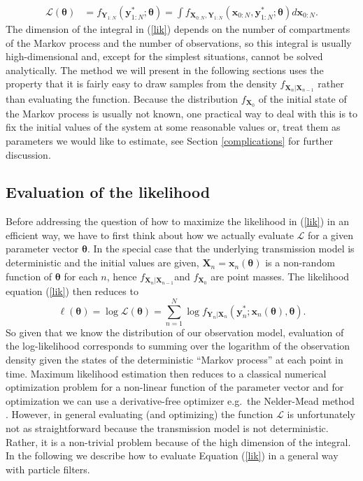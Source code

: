 \begin{align}
\mathcal{L}(\bm{\theta})&=f_{\bm{Y}_{1:N}}(\bm{y}^*_{1:N};\bm{\theta})=\int f_{\bm{X}_{0:N},\bm{Y}_{1:N}}(\bm{x}_{0:N},\bm{y}^*_{1:N};\bm{\theta})d\bm{x}_{0:N}.
\label{lik}
\end{align}
The dimension of the integral in (\ref{lik}) depends on the number of compartments of the Markov process and the number of observations, so this integral is usually high-dimensional and, except for the simplest situations, cannot be solved analytically. The method we will present in the following sections uses the property that it is fairly easy to draw samples from the density $f_{\bm{X}_n|\bm{X}_{n-1}}$ rather than evaluating the function. Because the distribution  $f_{\bm{X}_0}$ of the initial state of the Markov process is usually not known,  one practical way to deal with this is to  fix the initial values of the system  at some  reasonable values or,  treat them  as parameters we would like to estimate, see Section \ref{complications} for further discussion.  
 \subsection{Evaluation of the likelihood}
 \label{evaluation}
 Before addressing the question of  how to maximize the likelihood in (\ref{lik}) in an efficient way, we have to first think about how we actually evaluate $\mathcal{L}$ for a given parameter vector $\bm{\theta}$. 
In the special case that the underlying transmission model is deterministic and the initial values are given,  $\bm{X}_n=\bm{x}_n(\bm{\theta})$ is a non-random function of $\bm{\theta}$ for each $n$, hence $f_{\bm{X}_n|\bm{X}_{n-1}}$and $f_{\bm{X}_0}$   are point masses. 
The likelihood  equation (\ref{lik}) then reduces to 
\begin{equation}
\ell(\bm{\theta})=\log \mathcal{L}(\bm{\theta})= \sum_{n=1}^N \log f_{\bm{Y}_n|\bm{X}_{n}}(\bm{y}^*_n;\bm{x}_{n}(\bm{\theta}),\bm{\theta}).
\end{equation} 
So given that we know the distribution of our observation model, evaluation of the log-likelihood corresponds to  summing over the logarithm of the observation density given the states of the deterministic ``Markov process'' at each point in time. Maximum likelihood estimation then  reduces to a classical numerical optimization problem for a non-linear  function of the parameter vector and for optimization we can use a derivative-free optimizer e.g.\ the  Nelder-Mead method \citep{nelder}. 
However, in general  evaluating (and optimizing) the function $\mathcal{L}$ is unfortunately not as straightforward because the transmission model is not deterministic.
Rather, it is a non-trivial problem because of the high dimension of the integral.  In the following we describe how to evaluate Equation (\ref{lik})  in a general way with particle filters.
